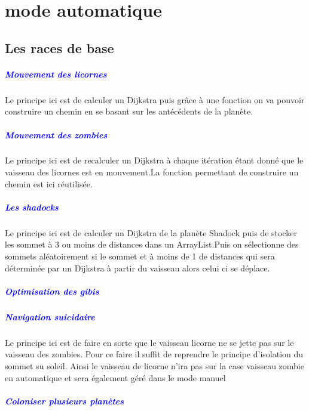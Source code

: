 \documentclass{report}
\begin{document}
			
	\chapter{mode automatique}
		\section{Les races de base}
			\paragraph{\textcolor{blue}{Mouvement des licornes}}
			Le principe ici est de calculer un Dijkstra puis grâce à une fonction on va pouvoir construire un chemin en se basant sur les antécédents de la planète.
			\paragraph{\textcolor{blue}{Mouvement des zombies}}
			Le principe ici est de recalculer un Dijkstra à chaque itération étant donné que le vaisseau des licornes est en mouvement.La fonction permettant de construire un chemin est ici réutilisée.
			\paragraph{\textcolor{blue}{Les shadocks}}
			Le principe ici est de calculer un Dijkstra de la planète Shadock puis de stocker les sommet à 3 ou moins de distances dans un ArrayList.Puis on sélectionne des sommets aléatoirement si le sommet et à moins de 1 de distances qui sera déterminée par un Dijkstra à partir du vaisseau alors celui ci se déplace.
			\paragraph{\textcolor{blue}{Optimisation des gibis}}
			\paragraph{\textcolor{blue}{Navigation suicidaire}}
			Le principe ici est de faire en sorte que le vaisseau licorne ne se jette pas sur le vaisseau des zombies.
			Pour ce faire il suffit de reprendre le principe d'isolation du sommet su soleil.
			Ainsi le vaisseau de licorne n'ira pas sur la case vaisseau zombie en automatique et sera également géré dans le mode manuel
			\paragraph{\textcolor{blue}{Coloniser plusieurs planètes}}
	\setcounter{tocdepth}{4}
	\tableofcontents
\end{document}
